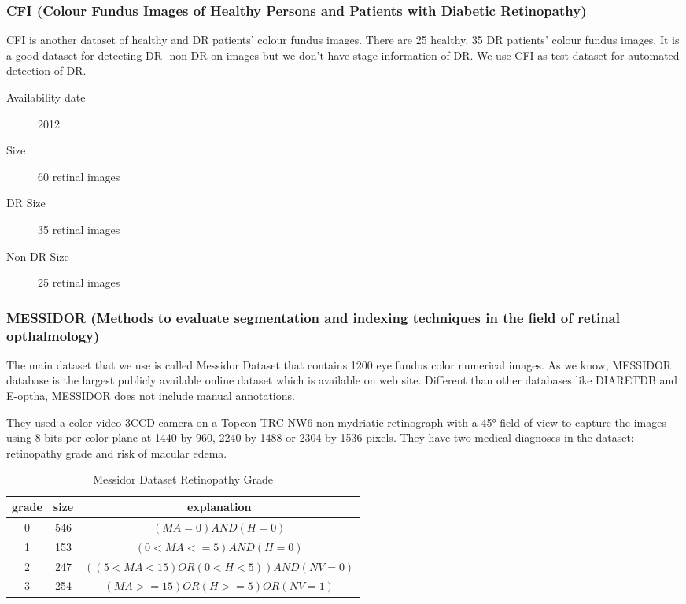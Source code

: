 \subsubsection{CFI (Colour Fundus Images of Healthy Persons and Patients with Diabetic Retinopathy)}

CFI is another dataset \citep{CFI} of healthy and DR patients' colour fundus images. There are 25 healthy, 35 DR patients' colour fundus images. It is a good dataset for detecting DR- non DR on images but we don't have stage information of DR. \citep{alipour2012analysis} We use CFI as test dataset for automated detection of DR. 

\begin{description}
    \item[Availability date] 2012
    \item[Size] 60 retinal images
    \item[DR Size] 35 retinal images
    \item[Non-DR Size] 25 retinal images
\end{description}

\subsubsection{MESSIDOR (Methods to evaluate segmentation and indexing techniques in the field of retinal opthalmology)}

The main dataset that we use is called Messidor Dataset \citep{decenciere2014feedback} that contains 1200 eye fundus color numerical images. As we know, MESSIDOR database is the largest publicly available online dataset which is available on \citet{MESSIDOR} web site. Different than other databases like DIARETDB and E-optha, MESSIDOR does not include manual annotations\citep{decenciere2014feedback}.

They used a color video 3CCD camera on a Topcon TRC NW6 non-mydriatic retinograph with a 45° field of view to capture the images using 8 bits per color plane at 1440 by 960, 2240  by 1488 or 2304 by 1536 pixels. 
They have two medical diagnoses in the dataset: retinopathy grade and risk of macular edema. 

\begin{table}[t]
\centering
\caption{Messidor Dataset Retinopathy Grade} \label{tab:rg}
\begin{tabular}{|c|c|c|} \hline
grade & size & explanation \\ \hline
0 & 546 & $(MA = 0) AND (H = 0)$ \\ \hline
1 & 153 & $(0 < MA <= 5) AND (H = 0)$\\\hline
2 & 247 & $((5 < MA < 15) OR (0 < H < 5)) AND (NV = 0)$ \\\hline
3 & 254 & $(MA >= 15) OR (H >=5) OR (NV = 1)$\\\hline
\end{tabular}
\end{table}

